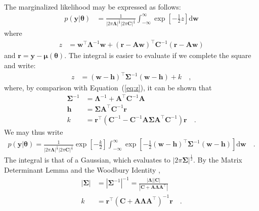 \documentclass[modern]{rnaastex}
\renewcommand{\eqref}[1]{\ref{eq:#1}}
\newcommand{\Eq}[1]{Equation~(\eqref{#1})}
\newcommand{\eq}[1]{\Eq{#1}}
\newcommand{\eqlabel}[1]{\label{eq:#1}}
\newcommand{\dd}{\ensuremath{ \mathrm{d}}}
\newcommand{\bvec}[1]{{\ensuremath{\boldsymbol{#1}}}}
\newcommand{\mA}{\ensuremath{\bvec{A}}}
\newcommand{\mC}{\ensuremath{\bvec{C}}}
\newcommand{\mS}{\ensuremath{\bvec{\Sigma}}}
\newcommand{\mL}{\ensuremath{\bvec{\Lambda}}}
\newcommand{\vw}{\ensuremath{\bvec{w}}}
\newcommand{\vy}{\ensuremath{\bvec{y}}}
\newcommand{\vt}{\ensuremath{\bvec{\theta}}}
\newcommand{\vm}{\ensuremath{\bvec{\mu}(\bvec{\theta})}}
\newcommand{\vre}{\ensuremath{\bvec{r}}}
\newcommand{\vh}{\ensuremath{\bvec{h}}}
\begin{document}
The marginalized likelihood may be expressed as follows:
\begin{align}
\eqlabel{integral}
p(\vy | \vt) &= \frac{1}{|2\pi\mL|^\frac{1}{2} |2\pi\mC|^\frac{1}{2}}
                \int_{-\infty}^{\infty} \exp \left[ -\frac{1}{2} z \right] \dd\vw
\end{align}
%
where
%
\begin{align}
\eqlabel{z}
z &= \vw^\top \mL^{-1} \vw + (\vre - \mA \vw)^\top \mC^{-1} (\vre - \mA \vw)
\end{align}
%
and $\vre = \vy - \vm$.
%
The integral is easier to evaluate if we
complete the square and write:
%
\begin{align}
\eqlabel{z_square}
z &= (\vw - \vh)^\top \mS^{-1} (\vw - \vh) + k \quad,
\end{align}
%
where, by comparison with \eq{z}, it can be shown that
%
\begin{align}
\mS^{-1} &= \mL^{-1} + \mA^\top \mC^{-1} \mA \\
%
\vh &= \bvec{\Sigma} \mA^\top \mC^{-1} \vre \\
%
k &= \vre^\top \left( \mC^{-1} - \mC^{-1} \mA \mS \mA^\top \mC^{-1} \right) \vre
    \quad.
\end{align}
%
We may thus write
%
\begin{align}
\eqlabel{p(y|t)ugly}
p(\vy | \vt) = \frac{1}{
                |2\pi\mL|^\frac{1}{2}
                |2\pi\mC|^\frac{1}{2}}
                \exp \left[ -\frac{k}{2} \right]
                \int_{-\infty}^{\infty} \exp
                \left[-\frac{1}{2}(\vw - \vh)^\top \mS^{-1} (\vw - \vh)
                \right] \dd\vw \quad.
\end{align}
%
The integral is that of a Gaussian, which evaluates to
$|2\pi\bvec{\Sigma}|^\frac{1}{2}$.
By the Matrix Determinant Lemma and the Woodbury Identity
\citep[for example,][]{Woodbury:1950, Harville:1997},
%
\begin{align}
|\mS| &= {|\mS^{-1}|}^{-1} = \frac{|\mL| |\mC|}{|\mC + \mA \mL \mA^\top|} \nonumber \\
k &= \vre^\top \left( \mC + \mA \mL \mA^\top \right)^{-1} \vre \quad.
\end{align}
\end{document}
